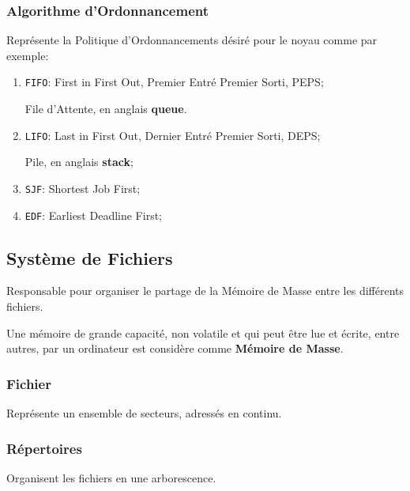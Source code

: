 \documentclass{article}
\begin{document}
\subsubsection{Algorithme d'Ordonnancement}
\begin{definition}
    Représente la Politique d'Ordonnancements désiré pour le noyau comme par exemple:
    \begin{enumerate}[noitemsep, rightmargin = \leftmargin]
        \item \texttt{FIFO}: First in First Out, Premier Entré Premier Sorti, PEPS;
        \begin{example}
            File d'Attente, en anglais \textbf{queue}.
        \end{example}
        \item \texttt{LIFO}: Last in First Out, Dernier Entré Premier Sorti, DEPS;
        \begin{example}
            Pile, en anglais \textbf{stack};
        \end{example}
        \item \texttt{SJF}: Shortest Job First;
        \item \texttt{EDF}: Earliest Deadline First;
    \end{enumerate}
\end{definition}

\subsection{Système de Fichiers}
\begin{definition}
    Responsable pour organiser le partage de la Mémoire de Masse entre les différents fichiers.

    \begin{remark}
        Une mémoire de grande capacité, non volatile et qui peut être lue et écrite, entre autres, par un ordinateur est considère comme \textbf{Mémoire de Masse}.
    \end{remark}
\end{definition}
\subsubsection{Fichier}
\begin{definition}
    Représente un ensemble de secteurs, adressés en continu. 
\end{definition}

\subsubsection{Répertoires}
\begin{definition}
    Organisent les fichiers en une arborescence.
\end{definition}
\end{document}
